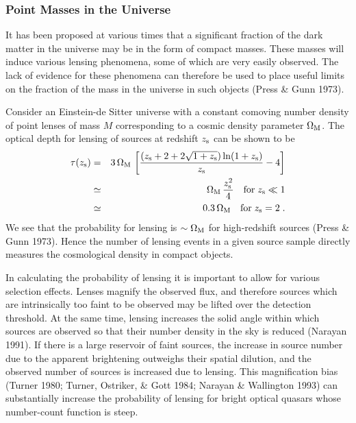 \documentclass[a4paper,10pt]{article} %
\begin{document}
\subsubsection{Point Masses in the Universe}
\label{NB:subsubsect2.3.1}

It has been proposed at various times that a significant fraction of
the dark matter in the universe may be in the form of compact masses.
These masses will induce various lensing phenomena, some of which are
very easily observed. The lack of evidence for these phenomena can
therefore be used to place useful limits on the fraction of the mass
in the universe in such objects (Press \& Gunn 1973).

Consider an Einstein-de Sitter universe with a constant comoving
number density of point lenses of mass $M$ corresponding to a cosmic
density parameter $\Omega_{\rm M}$. The optical depth for lensing of
sources at redshift $z_{\rm s}$ can be shown to be
\begin{eqnarray}
  \tau(z_{\rm s}) &=& 3\,\Omega_{\rm M}\,\left[
    \frac{(z_{\rm s}+2+2\sqrt{1+z_{\rm s}})\ln(1+z_{\rm s})}
    {z_{\rm s}}-4
  \right]\nonumber\\
  &\simeq&
  \Omega_{\rm M}\,\frac{z_{\rm s}^2}{4}
    \quad\hbox{for}\;z_{\rm s}\ll1\nonumber\\
  &\simeq&
  0.3\,\Omega_{\rm M}
    \quad\hbox{for}\;z_{\rm s}=2\;.\nonumber\\
\label{eq:2.37}
\end{eqnarray}
We see that the probability for lensing is $\sim\Omega_{\rm M}$ for
high-redshift sources (Press \& Gunn 1973). Hence the number of
lensing events in a given source sample directly measures the
cosmological density in compact objects.

In calculating the probability of lensing it is important to allow for
various selection effects. Lenses magnify the observed flux, and
therefore sources which are intrinsically too faint to be observed may
be lifted over the detection threshold. At the same time, lensing
increases the solid angle within which sources are observed so that
their number density in the sky is reduced (Narayan 1991). If there is
a large reservoir of faint sources, the increase in source number due
to the apparent brightening outweighs their spatial dilution, and the
observed number of sources is increased due to lensing. This
magnification bias (Turner 1980; Turner, Ostriker, \& Gott 1984;
Narayan \& Wallington 1993) can substantially increase the probability
of lensing for bright optical quasars whose number-count function is
steep.
\end{document}
